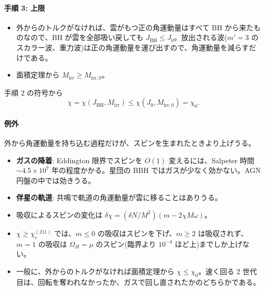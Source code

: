 \paragraph{手順 3: 上限}
\begin{itemize}
\item 外からのトルクがなければ、雲がもつ正の角運動量はすべて BH から来たものなので、BH が雲を全部吸い戻しても $J_\mathrm{BH}\le J_0$。放出される波($m'=3$ のスカラー波、重力波)は正の角運動量を運び出すので、角運動量を減らすだけである。
\item 面積定理から $M_\mathrm{irr}\ge M_{\mathrm{irr},0}$。
\end{itemize}
手順 2 の符号から
\begin{equation}
\chi=\chi(J_\mathrm{BH},M_\mathrm{irr})\le\chi(J_0,M_{\mathrm{irr},0})=\chi_0.
\end{equation}

\paragraph{例外}
外から角運動量を持ち込む過程だけが、スピンを生まれたときより上げうる。
\begin{itemize}
\item \textbf{ガスの降着}: Eddington 限界でスピンを $O(1)$ 変えるには、Salpeter 時間 $\sim4.5\times10^7$ 年の程度かかる。星団の BBH ではガスが少なく効かない。AGN 円盤の中では効きうる。
\item \textbf{伴星の軌道}: 共鳴で軌道の角運動量が雲に移ることはありうる。
\end{itemize}

\begin{summary}
\begin{itemize}
\item 吸収によるスピンの変化は $\delta\chi=(\delta N/M^2)(m-2\chi M\omega)$。
\item $\chi\ge\chi_c^{(211)}$ では、$m\le0$ の吸収はスピンを下げ、$m\ge2$ は吸収されず、$m=1$ の吸収は $\Omega_H=\mu$ のスピン(臨界より $10^{-4}$ ほど上)までしか上げない。
\item 一般に、外からのトルクがなければ面積定理から $\chi\le\chi_0$。速く回る 2 世代目は、回転を奪われなかったか、ガスで回し直されたかのどちらかである。
\end{itemize}
\end{summary}
